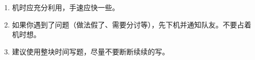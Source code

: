 \begin{enumerate}
    \item 机时应充分利用，手速应快一些。
    \item 如果你遇到了问题（做法假了、需要分讨等），先下机并通知队友。不要占着机时想。
    \item 建议使用整块时间写题，尽量不要断断续续的写。
\end{enumerate}